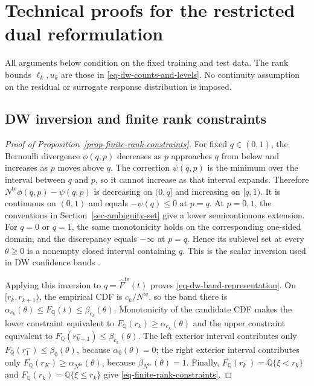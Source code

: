 \section{Technical proofs for the restricted dual reformulation}
\label{app-restricted-duality}

All arguments below condition on the fixed training and test data. The rank bounds $\ell_k,u_k$ are those in \eqref{eq-dw-counts-and-levels}. No continuity assumption on the residual or surrogate response distribution is imposed.

\subsection{DW inversion and finite rank constraints}
\label{app-dw-rank}

\begin{proof}[Proof of Proposition~\ref{prop-finite-rank-constraints}]
  For fixed $q\in(0,1)$, the Bernoulli divergence $\phi(q,p)$ decreases as $p$ approaches $q$ from below and increases as $p$ moves above $q$. The correction $\psi(q,p)$ is the minimum over the interval between $q$ and $p$, so it cannot increase as that interval expands. Therefore $N^{\mathrm{te}}\phi(q,p)-\psi(q,p)$ is decreasing on $(0,q]$ and increasing on $[q,1)$. It is continuous on $(0,1)$ and equals $-\psi(q)\le0$ at $p=q$. At $p=0,1$, the conventions in Section~\ref{sec-ambiguity-set} give a lower semicontinuous extension. For $q=0$ or $q=1$, the same monotonicity holds on the corresponding one-sided domain, and the discrepancy equals $-\infty$ at $p=q$. Hence its sublevel set at every $\theta\ge0$ is a nonempty closed interval containing $q$. This is the scalar inversion used in DW confidence bands \citep[Supplement, Section~S.6]{L.J23}.

  Applying this inversion to $q=\widehat F^{\mathrm{te}}(t)$ proves \eqref{eq-dw-band-representation}. On $[r_k,r_{k+1})$, the empirical CDF is $c_k/N^{\mathrm{te}}$, so the band there is
  $\alpha_{c_k}(\theta)\le F_{\mathbb Q}(t)\le\beta_{c_k}(\theta)$.
  Monotonicity of the candidate CDF makes the lower constraint equivalent to
  $F_{\mathbb Q}(r_k)\ge\alpha_{c_k}(\theta)$ and the upper constraint equivalent to
  $F_{\mathbb Q}(r_{k+1}^-)\le\beta_{c_k}(\theta)$.
  The left exterior interval contributes only
  $F_{\mathbb Q}(r_1^-)\le\beta_0(\theta)$, because $\alpha_0(\theta)=0$; the right exterior interval contributes only
  $F_{\mathbb Q}(r_K)\ge\alpha_{N^{\mathrm{te}}}(\theta)$, because $\beta_{N^{\mathrm{te}}}(\theta)=1$.
  Finally, $F_{\mathbb Q}(r_k^-)=\mathbb Q\{\xi<r_k\}$ and $F_{\mathbb Q}(r_k)=\mathbb Q\{\xi\le r_k\}$ give \eqref{eq-finite-rank-constraints}.
\end{proof}

